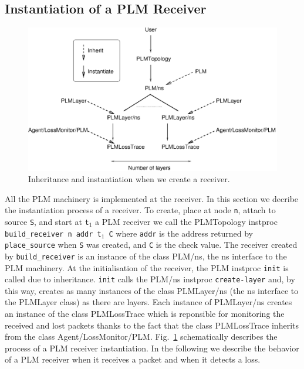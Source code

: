 {\subsection{Instantiation of a PLM Receiver}

\begin{figure}[tbp]
  \centerline{\includegraphics{figures/instanPLMrecv.eps}}
  \caption{Inheritance and instantiation when we create a receiver.}
  \label{fig:instanPLMrecv}
\end{figure}

All the PLM machinery is implemented at the receiver. In this section we decribe
the instantiation process of a receiver. To create, place at node
{\tt n},  attach to source {\tt S}, and start at {\tt t$_1$} a PLM receiver we
call the PLMTopology instproc {\tt 
  build\_receiver n addr t$_1$ C} where {\tt addr} is the address returned
by {\tt place\_source} when {\tt S} was created, and {\tt C} is the check value. The
receiver created by {\tt build\_receiver} is an instance of the class PLM/ns,
the ns interface to the PLM 
machinery. At the initialisation of the receiver, the PLM instproc {\tt init} is
called due to inheritance. {\tt init} calls the PLM/ns instproc
{\tt create-layer} and, by this way,  creates as many instances of the class 
PLMLayer/ns (the ns interface to the PLMLayer class) as there are layers. Each
instance of PLMLayer/ns creates an instance of the class PLMLossTrace which is
reponsible for 
monitoring the received and lost packets thanks to the fact that the class
PLMLossTrace inherits from the class Agent/LossMonitor/PLM. 
Fig.~\ref{fig:instanPLMrecv} schematically describes the process  of a PLM
receiver instantiation. In the following we describe the behavior of a PLM
receiver when it receives a packet and when it detects a loss.



}
